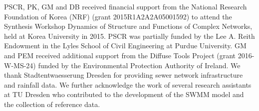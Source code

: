 \documentclass[draft,linenumbers]{agujournal2018}
\begin{document}
\acknowledgments
PSCR, PK, GM and DB received f\/inancial support from the National Research Foundation of Korea (NRF) (grant 2015R1A2A2A05001592) to attend the Synthesis Workshop Dynamics of Structure and Functions of Complex Networks, held at Korea University in 2015. PSCR was partially funded by the Lee A. Reith Endowment in the Lyles School of Civil Engineering at Purdue University. GM and PEM received additional support from the Dif\/fuse Tools Project (grant 2016-W-MS-24) funded by the Environmental Protection Authority of Ireland. We thank Stadtentwaesserung Dresden for providing sewer network infrastructure and rainfall data. We further acknowledge the work of several research assistants at TU Dresden who contributed to the development of the SWMM model and the collection of reference data.


%
% 
%





\end{document}
